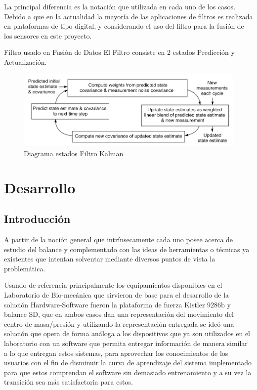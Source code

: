\documentclass[12pt,a4paper]{article}
\begin{document}
La principal diferencia es la notación que utilizada en cada uno de los casos.
Debido a que en la actualidad la mayoría de las aplicaciones de filtros es realizada en plataformas de tipo digital, y considerando el uso del filtro para la fusión de los sensores en este proyecto.

Filtro usado en Fusión de Datos \cite{mau_how_2005} 
El Filtro consiste en 2 estados Predicción y Actualización.

\begin{figure}[H]
	\centering
	\includegraphics[scale=0.5]{images/kalman-filter.png} 
	\caption{Diagrama estados Filtro Kalman}
	\label{fig:diagramakalman}
\end{figure}

\section{Desarrollo}
\subsection{Introducción}

A partir de la noción general que intrínsecamente cada uno posee acerca de estudio del balance y complementado con las ideas de herramientas o técnicas ya existentes que intentan solventar mediante diversos puntos de vista la problemática.

Usando de referencia principalmente los equipamientos disponibles en el Laboratorio de Bio-mecánica que sirvieron de base para el desarrollo de la solución Hardware-Software fueron la plataforma de fuerza Kistler 9286b \cite{KISTLER} y balance SD, que en ambos casos dan una representación del movimiento del centro de masa/presión y utilizando la representación entregada se ideó una solución que opera de forma análoga a los dispositivos que ya son utilizados en el laboratorio con un software que permita entregar información de manera similar a lo que entregan estos sistemas, para aprovechar los conocimientos de los usuarios con el fin de disminuir la curva de aprendizaje del sistema implementado para que estos comprendan el software sin demasiado entrenamiento y a su vez la transición sea más satisfactoria para estos.
\end{document}
